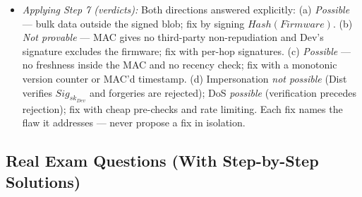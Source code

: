 \documentclass[12pt, a4paper]{article}
\begin{document}
\begin{itemize}
    Key fact: a MAC authenticates between key holders but gives a third party nothing.
    \item \textit{Applying Step 7 (verdicts):} Both directions answered explicitly: (a) \emph{Possible} --- bulk data outside the signed blob; fix by signing $Hash(Firmware)$. (b) \emph{Not provable} --- MAC gives no third-party non-repudiation and Dev's signature excludes the firmware;
    fix with per-hop signatures. (c) \emph{Possible} --- no freshness inside the MAC and no recency check; fix with a monotonic version counter or MAC'd timestamp. (d) Impersonation \emph{not possible} (Dist verifies $Sig_{sk_{Dev}}$ and forgeries are rejected);
    DoS \emph{possible} (verification precedes rejection); fix with cheap pre-checks and rate limiting. Each fix names the flaw it addresses --- never propose a fix in isolation.
\end{itemize}

\subsection*{Real Exam Questions (With Step-by-Step Solutions)}
\end{document}
